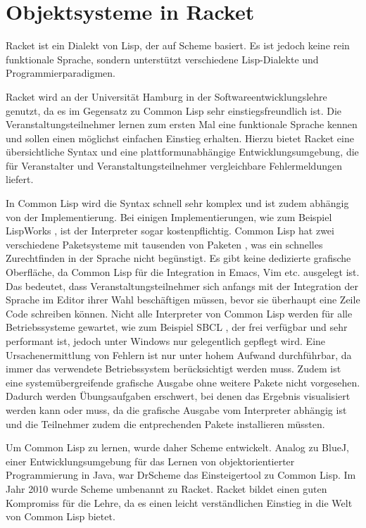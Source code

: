 \chapter{Objektsysteme in Racket}
Racket ist ein Dialekt von Lisp, der auf Scheme basiert. Es ist jedoch keine rein funktionale Sprache, sondern unterstützt verschiedene Lisp-Dialekte und  Programmierparadigmen. 

Racket wird an der Universität Hamburg in der Softwareentwicklungslehre genutzt, da es im Gegensatz zu Common Lisp sehr einstiegsfreundlich ist. Die Veranstaltungsteilnehmer lernen zum ersten Mal eine funktionale Sprache kennen und sollen einen möglichst einfachen Einstieg erhalten. Hierzu bietet Racket eine übersichtliche Syntax und eine plattformunabhängige Entwicklungsumgebung, die für Veranstalter und Veranstaltungsteilnehmer vergleichbare Fehlermeldungen liefert.

In Common Lisp wird die Syntax schnell sehr komplex und ist zudem abhängig von der Implementierung. Bei einigen Implementierungen, wie zum Beispiel LispWorks \cite{lispworks}, ist der Interpreter sogar kostenpflichtig. Common Lisp hat zwei verschiedene Paketsysteme mit tausenden von Paketen \cite{asdf}\cite{quicklisp}, was ein schnelles Zurechtfinden in der Sprache nicht begünstigt. Es gibt keine dedizierte grafische Oberfläche, da Common Lisp für die Integration in Emacs, Vim etc. ausgelegt ist. Das bedeutet, dass Veranstaltungsteilnehmer sich anfangs mit der Integration der Sprache im Editor ihrer Wahl beschäftigen müssen, bevor sie überhaupt eine Zeile Code schreiben können. Nicht alle Interpreter von Common Lisp werden  für alle Betriebssysteme gewartet, wie zum Beispiel SBCL \cite{sbcl}, der frei verfügbar und sehr performant ist, jedoch unter Windows nur gelegentlich gepflegt wird. Eine Ursachenermittlung von Fehlern ist nur unter hohem Aufwand durchführbar, da immer das verwendete Betriebssystem berücksichtigt werden muss. Zudem ist eine systemübergreifende grafische Ausgabe ohne weitere Pakete nicht vorgesehen. Dadurch werden Übungsaufgaben erschwert, bei denen das Ergebnis visualisiert werden kann oder muss, da die grafische Ausgabe vom Interpreter abhängig ist und die Teilnehmer zudem die entprechenden Pakete installieren müssten. 

Um Common Lisp zu lernen, wurde daher Scheme entwickelt. Analog zu BlueJ, einer Entwicklungsumgebung für das Lernen von objektorientierter Programmierung in Java, war DrScheme das Einsteigertool zu Common Lisp. Im Jahr 2010 wurde Scheme umbenannt zu Racket. Racket bildet einen guten Kompromiss für die Lehre, da es einen leicht verständlichen Einstieg in die Welt von Common Lisp bietet.

